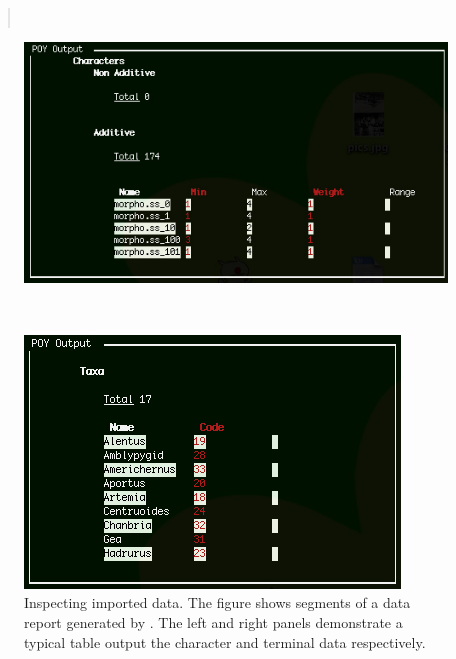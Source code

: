 {\begin{quote}
\\
\end{quote}

\begin{figure}
\centering
\begin{minipage}[c]{0.52\textwidth}
\includegraphics[width=\textwidth]{doc/figures/report2.jpg}
\end{minipage}
\,
\begin{minipage}[c]{0.44\textwidth}
\includegraphics[width=\textwidth]{doc/figures/report3.jpg}
\end{minipage}
\caption{Inspecting imported data. The figure shows segments of 
a data report generated by . 
The left and right panels demonstrate a typical table output 
the character and terminal data respectively.}
\label{fig:reportdata}
\end{figure}

}
